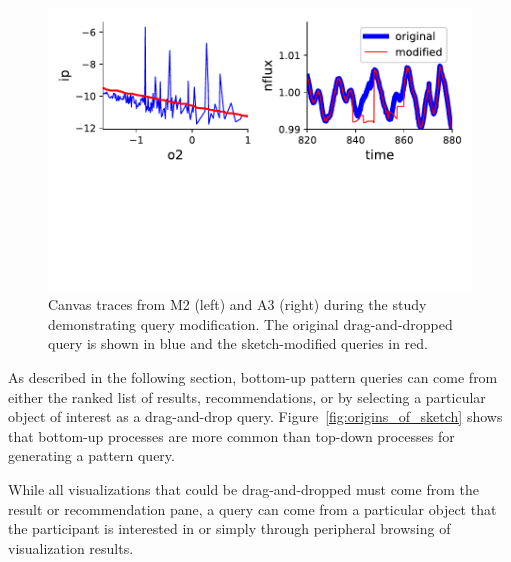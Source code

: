\begin{figure}[h!]
    \centering
    \includegraphics[width=\columnwidth]{figures/QueryModificationBySketch.pdf}
    \caption{Canvas traces from M2 (left) and A3 (right) during the study demonstrating query modification. The original drag-and-dropped query is shown in blue and the sketch-modified queries in red.}
    \label{query_modification}
    \vspace{-10pt}
\end{figure}
As described in the following section, 
bottom-up pattern queries can come from either 
the ranked list of results, 
recommendations, or by selecting a 
particular object of interest as a drag-and-drop query. 
Figure~\ref{fig:origins_of_sketch} shows that 
bottom-up processes are more common 
than top-down processes for generating a pattern query.

While all visualizations that could be drag-and-dropped 
must come from the result or recommendation pane, 
a query can come from a particular object 
that the participant is interested in or simply 
through peripheral browsing of visualization results.

